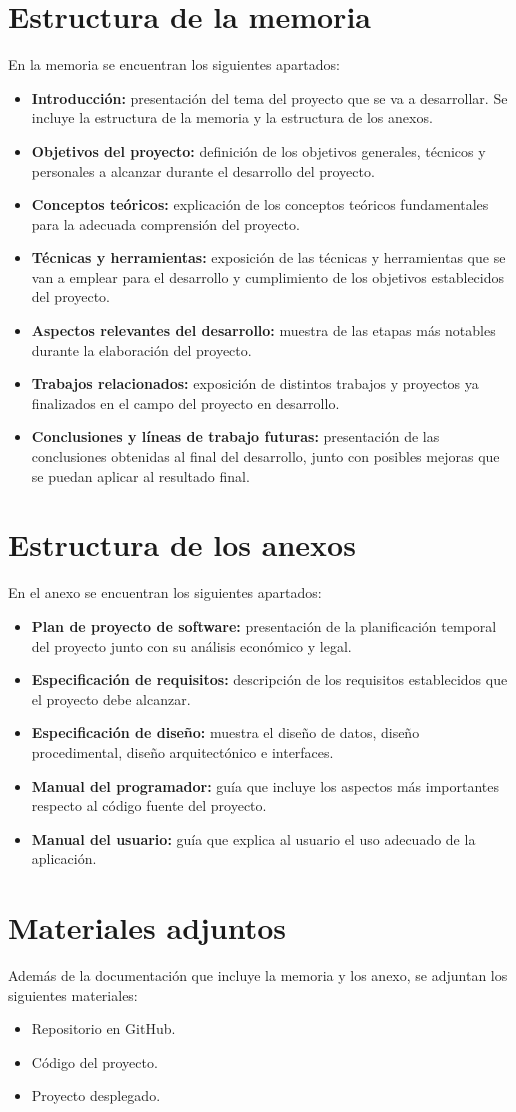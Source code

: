 \section{Estructura de la memoria}
En la memoria se encuentran los siguientes apartados:
\begin{itemize}
    \item \textbf{Introducción:} presentación del tema del proyecto que se va a desarrollar. Se incluye la estructura de la memoria y la estructura de los anexos.
    \item \textbf{Objetivos del proyecto:} definición de los objetivos generales, técnicos y personales a alcanzar durante el desarrollo del proyecto.
    \item \textbf{Conceptos teóricos:} explicación de los conceptos teóricos fundamentales para la adecuada comprensión del proyecto.
    \item \textbf{Técnicas y herramientas:} exposición de las técnicas y herramientas que se van a emplear para el desarrollo y cumplimiento de los objetivos establecidos del proyecto.
    \item \textbf{Aspectos relevantes del desarrollo:} muestra de las etapas más notables durante la elaboración del proyecto. 
    \item \textbf{Trabajos relacionados:} exposición de distintos trabajos y proyectos ya finalizados en el campo del proyecto en desarrollo.
    \item \textbf{Conclusiones y líneas de trabajo futuras:} presentación de las conclusiones obtenidas al final del desarrollo, junto con posibles mejoras que se puedan aplicar al resultado final.
\end{itemize}

\section{Estructura de los anexos}
En el anexo se encuentran los siguientes apartados:
\begin{itemize}
    \item \textbf{Plan de proyecto de software:} presentación de la planificación temporal del proyecto junto con su análisis económico y legal.
    \item \textbf{Especificación de requisitos:} descripción de los requisitos establecidos que el proyecto debe alcanzar.
    \item \textbf{Especificación de diseño:} muestra el diseño de datos, diseño procedimental, diseño arquitectónico e interfaces.
    \item \textbf{Manual del programador:} guía que incluye los aspectos más importantes respecto al código fuente del proyecto.
    \item \textbf{Manual del usuario:} guía que explica al usuario el uso adecuado de la aplicación.
\end{itemize}

\section{Materiales adjuntos}
Además de la documentación que incluye la memoria y los anexo, se adjuntan los siguientes materiales:
\begin{itemize}
    \item Repositorio en GitHub.
    \item Código del proyecto.
    \item Proyecto desplegado.  
\end{itemize}